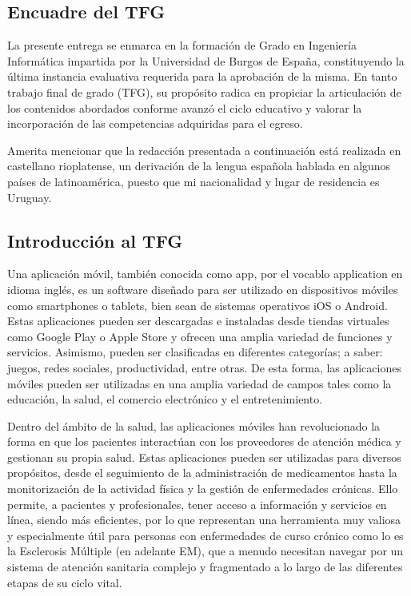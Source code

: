 
\subsection{Encuadre del TFG}
La presente entrega se enmarca en la formación de Grado en Ingeniería Informática impartida por la Universidad de Burgos de España, constituyendo la última instancia evaluativa requerida para la aprobación de la misma.
En tanto trabajo final de grado (TFG), su propósito radica en propiciar la articulación de los contenidos abordados conforme avanzó el ciclo educativo y valorar la incorporación de las competencias adquiridas para el egreso.

Amerita mencionar que la redacción presentada a continuación está realizada en castellano rioplatense, un derivación de la lengua española hablada en algunos países de latinoamérica, puesto que mi nacionalidad y lugar de residencia es Uruguay.

\subsection{Introducción al TFG}
Una aplicación móvil, también conocida como app, por el vocablo application en idioma inglés, es un software diseñado para ser utilizado en dispositivos móviles como smartphones o tablets, bien sean de sistemas operativos iOS o Android. Estas aplicaciones pueden ser descargadas e instaladas desde tiendas virtuales como Google Play o Apple Store y ofrecen una amplia variedad de funciones y servicios. Asimismo, pueden ser clasificadas en diferentes categorías; a saber: juegos, redes sociales, productividad, entre otras. De esta forma, las aplicaciones móviles pueden ser utilizadas en una amplia variedad de campos tales como la educación, la salud, el comercio electrónico y el entretenimiento.

Dentro del ámbito de la salud, las aplicaciones móviles han revolucionado la forma en que los pacientes interactúan con los proveedores de atención médica y gestionan su propia salud. Estas aplicaciones pueden ser utilizadas para diversos propósitos, desde el seguimiento de la administración de medicamentos hasta la monitorización de la actividad física y la gestión de enfermedades crónicas. Ello permite, a pacientes y profesionales, tener acceso a información y servicios en línea, siendo más eficientes, por lo que representan una herramienta muy valiosa y especialmente útil para personas con enfermedades de curso crónico como lo es la Esclerosis Múltiple (en adelante EM), que a menudo necesitan navegar por un sistema de atención sanitaria complejo y fragmentado a lo largo de las diferentes etapas de su ciclo vital.

